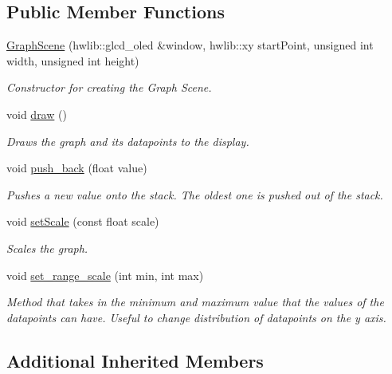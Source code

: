 \subsection*{Public Member Functions}
\begin{DoxyCompactItemize}
\item 
\mbox{\hyperlink{class_graph_scene_a346e3c827c9268f7b3bb29507dc28d6e}{Graph\+Scene}} (hwlib\+::glcd\+\_\+oled \&window, hwlib\+::xy start\+Point, unsigned int width, unsigned int height)
\begin{DoxyCompactList}\small\item\em Constructor for creating the Graph Scene. \end{DoxyCompactList}\item 
\mbox{\label{class_graph_scene_aedb5e4cc32fd4fdef6e0d5504605f4a1}} 
void \mbox{\hyperlink{class_graph_scene_aedb5e4cc32fd4fdef6e0d5504605f4a1}{draw}} ()
\begin{DoxyCompactList}\small\item\em Draws the graph and it\textquotesingle{}s datapoints to the display. \end{DoxyCompactList}\item 
void \mbox{\hyperlink{class_graph_scene_aa814c91b88a151e2137927c11bfc6b32}{push\+\_\+back}} (float value)
\begin{DoxyCompactList}\small\item\em Pushes a new value onto the stack. The oldest one is pushed out of the stack. \end{DoxyCompactList}\item 
void \mbox{\hyperlink{class_graph_scene_a1b84f3b649cd82142519771ceb94b04a}{set\+Scale}} (const float scale)
\begin{DoxyCompactList}\small\item\em Scales the graph. \end{DoxyCompactList}\item 
void \mbox{\hyperlink{class_graph_scene_a2d123bfb5cc206a179c04a70841e6a8f}{set\+\_\+range\+\_\+scale}} (int min, int max)
\begin{DoxyCompactList}\small\item\em Method that takes in the minimum and maximum value that the values of the datapoints can have. Useful to change distribution of datapoints on the y axis. \end{DoxyCompactList}\end{DoxyCompactItemize}
\subsection*{Additional Inherited Members}


